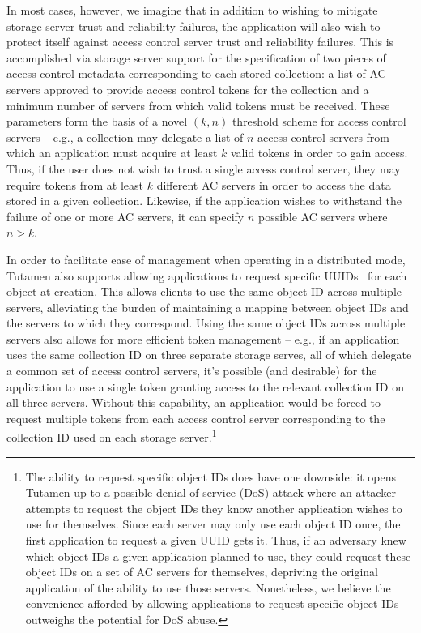 In most cases, however, we imagine that in addition to wishing to
mitigate storage server trust and reliability failures, the
application will also wish to protect itself against access control
server trust and reliability failures. This is accomplished via
storage server support for the specification of two pieces of access
control metadata corresponding to each stored collection: a list of AC
servers approved to provide access control tokens for the collection
and a minimum number of servers from which valid tokens must be
received. These parameters form the basis of a novel $(k, n)$
threshold scheme for access control servers -- e.g., a collection may
delegate a list of $n$ access control servers from which an
application must acquire at least $k$ valid tokens in order to gain
access. Thus, if the user does not wish to trust a single access
control server, they may require tokens from at least $k$ different AC
servers in order to access the data stored in a given
collection. Likewise, if the application wishes to withstand the
failure of one or more AC servers, it can specify $n$ possible AC
servers where $n > k$.

In order to facilitate ease of management when operating in a
distributed mode, Tutamen also supports allowing applications to
request specific UUIDs~\cite{leach2005} for each object at creation.
This allows clients to use the same object ID across multiple servers,
alleviating the burden of maintaining a mapping between object IDs and
the servers to which they correspond. Using the same object IDs across
multiple servers also allows for more efficient token management --
e.g., if an application uses the same collection ID on three separate
storage serves, all of which delegate a common set of access control
servers, it's possible (and desirable) for the application to use a
single token granting access to the relevant collection ID on all
three servers. Without this capability, an application would be forced
to request multiple tokens from each access control server
corresponding to the collection ID used on each storage
server.\footnote{The ability to request specific object IDs does have
  one downside: it opens Tutamen up to a possible denial-of-service
  (DoS) attack where an attacker attempts to request the object IDs
  they know another application wishes to use for themselves. Since
  each server may only use each object ID once, the first application
  to request a given UUID gets it. Thus, if an adversary knew which
  object IDs a given application planned to use, they could request
  these object IDs on a set of AC servers for themselves, depriving
  the original application of the ability to use those
  servers. Nonetheless, we believe the convenience afforded by
  allowing applications to request specific object IDs outweighs the
  potential for DoS abuse.}

